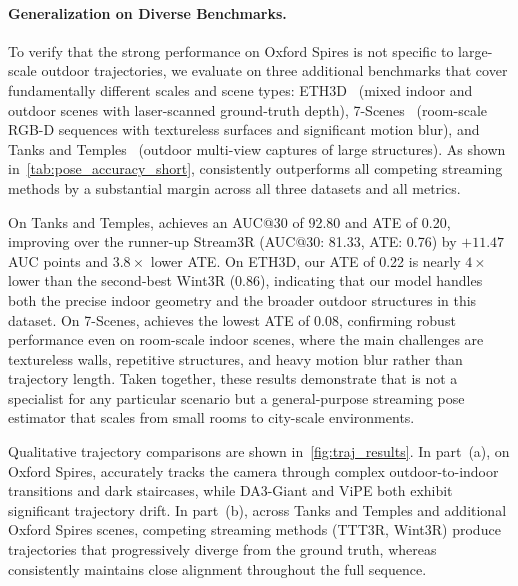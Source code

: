 \paragraph{Generalization on Diverse Benchmarks.}
To verify that the strong performance on Oxford Spires is not specific
to large-scale outdoor trajectories, we evaluate on three additional
benchmarks that cover fundamentally different scales and scene types:
ETH3D~\cite{schops2017multi} (mixed indoor and outdoor scenes with
laser-scanned ground-truth depth),
7-Scenes~\cite{shotton2013scene} (room-scale RGB-D sequences with
textureless surfaces and significant motion blur),
and Tanks and Temples~\cite{Knapitsch2017} (outdoor multi-view
captures of large structures).
As shown in~\cref{tab:pose_accuracy_short}, \method consistently
outperforms all competing streaming methods by a substantial margin
across all three datasets and all metrics.


On Tanks and Temples, \method achieves an AUC@30 of 92.80 and ATE of
0.20, improving over the runner-up Stream3R (AUC@30: 81.33, ATE: 0.76)
by $+11.47$ AUC points and $3.8\times$ lower ATE.
On ETH3D, our ATE of 0.22 is nearly $4\times$ lower than the
second-best Wint3R (0.86), indicating that our model handles both the
precise indoor geometry and the broader outdoor structures in this
dataset.
On 7-Scenes, \method achieves the lowest ATE of 0.08, confirming
robust performance even on room-scale indoor scenes, where the main
challenges are textureless walls, repetitive structures, and
heavy motion blur rather than trajectory length.
Taken together, these results demonstrate that \method is not a
specialist for any particular scenario but a general-purpose streaming
pose estimator that scales from small rooms to city-scale environments.

Qualitative trajectory comparisons are shown in~\cref{fig:traj_results}.
In part~(a), on Oxford Spires, \method accurately tracks the camera
through complex outdoor-to-indoor transitions and dark staircases,
while DA3-Giant and ViPE both exhibit significant trajectory
drift.
In part~(b), across Tanks and Temples and additional Oxford Spires
scenes, competing streaming methods (TTT3R, Wint3R) produce
trajectories that progressively diverge from the ground truth, whereas
\method consistently maintains close alignment throughout the full
sequence.






